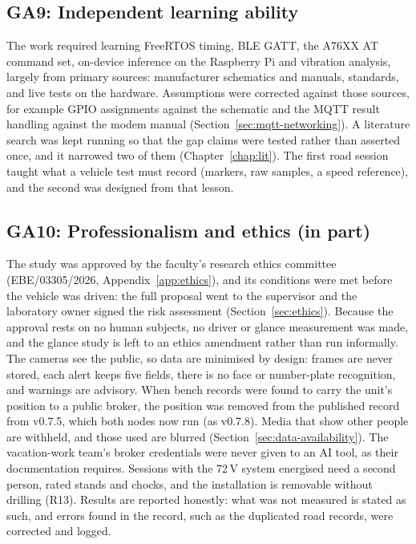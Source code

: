\subsection*{GA9: Independent learning ability}
The work required learning FreeRTOS timing, BLE GATT, the A76XX AT command set, on-device inference on the Raspberry Pi and vibration analysis, largely from primary sources: manufacturer schematics and manuals, standards, and live tests on the hardware. Assumptions were corrected against those sources, for example GPIO assignments against the schematic and the MQTT result handling against the modem manual (Section~\ref{sec:mqtt-networking}). A literature search was kept running so that the gap claims were tested rather than asserted once, and it narrowed two of them (Chapter~\ref{chap:lit}). The first road session taught what a vehicle test must record (markers, raw samples, a speed reference), and the second was designed from that lesson.

\subsection*{GA10: Professionalism and ethics (in part)}
The study was approved by the faculty's research ethics committee (EBE/03305/2026, Appendix~\ref{app:ethics}), and its conditions were met before the vehicle was driven: the full proposal went to the supervisor and the laboratory owner signed the risk assessment (Section~\ref{sec:ethics}). Because the approval rests on no human subjects, no driver or glance measurement was made, and the glance study is left to an ethics amendment rather than run informally. The cameras see the public, so data are minimised by design: frames are never stored, each alert keeps five fields, there is no face or number-plate recognition, and warnings are advisory. When bench records were found to carry the unit's position to a public broker, the position was removed from the published record from v0.7.5, which both nodes now run (as v0.7.8). Media that show other people are withheld, and those used are blurred (Section~\ref{sec:data-availability}). The vacation-work team's broker credentials were never given to an AI tool, as their documentation requires. Sessions with the 72\,V system energised need a second person, rated stands and chocks, and the installation is removable without drilling (R13). Results are reported honestly: what was not measured is stated as such, and errors found in the record, such as the duplicated road records, were corrected and logged.

